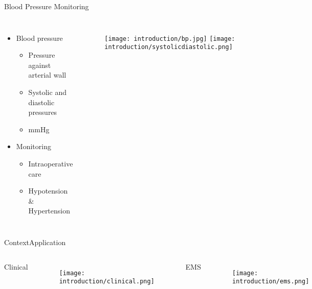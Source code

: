 \begin{frame}{Blood Pressure Monitoring}
    \begin{columns}
        \begin{itemize}

            \item Blood pressure
                  \begin{itemize}
                      \item Pressure against arterial wall
                      \item Systolic and diastolic pressures
                      \item mmHg
                  \end{itemize}


            \item Monitoring
                  \begin{itemize}
                      \item Intraoperative care
                      \item Hypotension \& Hypertension
                  \end{itemize}
        \end{itemize}

        \begin{figure}
            \centering
            \texttt{[image: introduction/bp.jpg]}
            \texttt{[image: introduction/systolicdiastolic.png]}
        \end{figure}
    \end{columns}


\end{frame}

\begin{frame}{Context}{Application}
    \begin{columns}
        \centering
        Clinical
        \begin{figure}
            \centering
            \texttt{[image: introduction/clinical.png]}
        \end{figure}

        \centering
        EMS
        \begin{figure}
            \centering
            \texttt{[image: introduction/ems.png]}
        \end{figure}
    \end{columns}
\end{frame}

